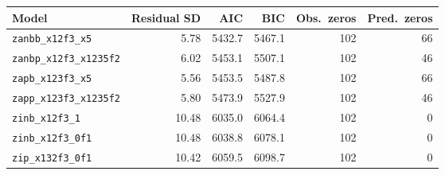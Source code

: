 \begin{tabular}{lrrrrr}
\toprule
Model & Residual SD & AIC & BIC & Obs.\ zeros & Pred.\ zeros \\
\midrule
\texttt{zanbb\_x12f3\_x5} & 5.78 & 5432.7 & 5467.1 & 102 & 66 \\
\texttt{zanbp\_x12f3\_x1235f2} & 6.02 & 5453.1 & 5507.1 & 102 & 46 \\
\texttt{zapb\_x123f3\_x5} & 5.56 & 5453.5 & 5487.8 & 102 & 66 \\
\texttt{zapp\_x123f3\_x1235f2} & 5.80 & 5473.9 & 5527.9 & 102 & 46 \\
\texttt{zinb\_x12f3\_1} & 10.48 & 6035.0 & 6064.4 & 102 & 0 \\
\texttt{zinb\_x12f3\_0f1} & 10.48 & 6038.8 & 6078.1 & 102 & 0 \\
\texttt{zip\_x132f3\_0f1} & 10.42 & 6059.5 & 6098.7 & 102 & 0 \\
\bottomrule
\end{tabular}
